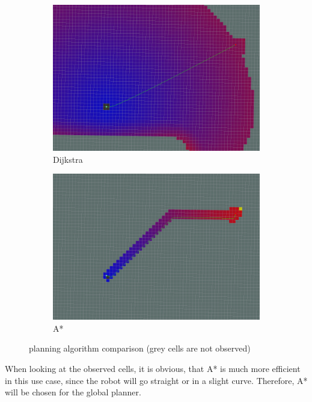 \begin{figure}[H]
	\begin{subfigure}{.5\linewidth}
		\includegraphics[width=\textwidth]{Pictures/Dijkstra}
		\caption{Dijkstra}
	\end{subfigure}	
	\begin{subfigure}{.5\linewidth}
		\includegraphics[width=\textwidth]{Pictures/AStar2}
		\caption{A*}
	\end{subfigure}

	\caption{planning algorithm comparison (grey cells are not observed)\cite{globalplanner}}
	\label{plannercomparison}

\end{figure}


When looking at the observed cells, it is obvious, that A* is much more efficient in this use case, since the robot will go straight or in a slight curve. Therefore, A* will be chosen for the global planner.\\

